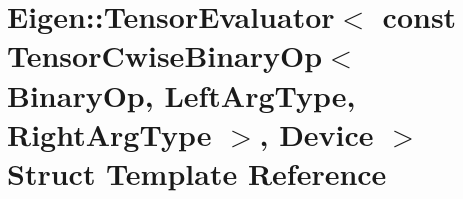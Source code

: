 \hypertarget{struct_eigen_1_1_tensor_evaluator_3_01const_01_tensor_cwise_binary_op_3_01_binary_op_00_01_left_d0674d2fbf9b5f3fd40347d3eda7a38d}{}\section{Eigen\+:\+:Tensor\+Evaluator$<$ const Tensor\+Cwise\+Binary\+Op$<$ Binary\+Op, Left\+Arg\+Type, Right\+Arg\+Type $>$, Device $>$ Struct Template Reference}
\label{struct_eigen_1_1_tensor_evaluator_3_01const_01_tensor_cwise_binary_op_3_01_binary_op_00_01_left_d0674d2fbf9b5f3fd40347d3eda7a38d}

